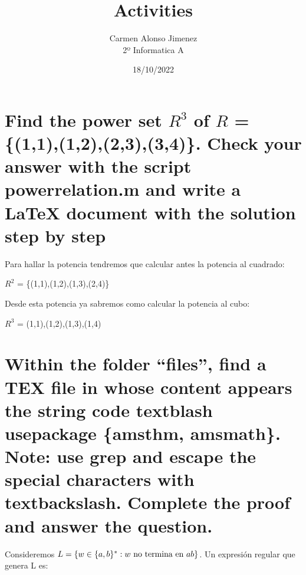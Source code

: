 \documentclass[11pt]{article}
\title{\textbf{Activities}}
\author{Carmen Alonso Jimenez\\
2º Informatica A}
\date{18/10/2022}
\begin{document}
\maketitle
\section{Find the power set $R^3$ of $R$ = \{(1,1),(1,2),(2,3),(3,4)\}. Check your answer with the script powerrelation.m and write a \LaTeX{} document with the solution step by step}


\begin {center}
Para hallar la potencia tendremos que calcular antes la potencia al cuadrado:

 
$R^2$ = \{(1,1),(1,2),(1,3),(2,4)\}


Desde esta potencia ya sabremos como calcular la potencia al cubo:

$R^3$ = {(1,1),(1,2),(1,3),(1,4)}

\end {center}
\section{Within the folder ``files'', find a TEX file in whose content appears the string code textblash usepackage \{amsthm, amsmath\}. Note: use grep and escape the special characters with textbackslash. Complete the proof and answer the question. }

Consideremos $L=\{w\in \{a,b\}^* : w \textnormal{ no termina en } ab\}$. Un expresión regular que genera L es: \\
\end{document}
